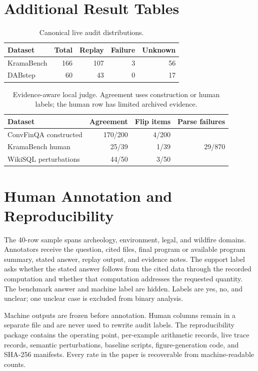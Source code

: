\section{Additional Result Tables}\label{app:tables}

\begin{table}[ht]
\centering
\caption{Canonical live audit distributions.}
\scriptsize
\begin{tabular}{@{}lrrrr@{}}
\toprule
Dataset & Total & Replay & Failure & Unknown \\
\midrule
KramaBench & 166 & 107 & 3 & 56 \\
DABstep & 60 & 43 & 0 & 17 \\
\bottomrule
\end{tabular}
\end{table}

\begin{table}[ht]
\centering
\caption{Evidence-aware local judge. Agreement uses construction or human labels; the human row has limited archived evidence.}
\scriptsize
\begin{tabular}{@{}lrrr@{}}
\toprule
Dataset & Agreement & Flip items & Parse failures \\
\midrule
ConvFinQA constructed & 170/200 & 4/200 & \multirow{3}{*}{29/870} \\
KramaBench human & 25/39 & 1/39 & \\
WikiSQL perturbations & 44/50 & 3/50 & \\
\bottomrule
\end{tabular}
\end{table}

\section{Human Annotation and Reproducibility}\label{app:human}

The 40-row sample spans archeology, environment, legal, and wildfire domains. Annotators receive the question, cited files, final program or available program summary, stated answer, replay output, and evidence notes. The support label asks whether the stated answer follows from the cited data through the recorded computation and whether that computation addresses the requested quantity. The benchmark answer and machine label are hidden. Labels are yes, no, and unclear; one unclear case is excluded from binary analysis.

Machine outputs are frozen before annotation. Human columns remain in a separate file and are never used to rewrite audit labels. The reproducibility package contains the operating point, per-example arithmetic records, live trace records, semantic perturbations, baseline scripts, figure-generation code, and SHA-256 manifests. Every rate in the paper is recoverable from machine-readable counts.
